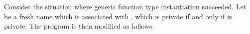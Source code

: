 \documentclass[makeidx]{article}
\begin{document}
{{%
%
%
%
%
%
%
%

\LMHash{}%
Consider the situation where generic function type instantiation succeeded.
Let \gmiName{} be a fresh name which is associated with \id,
which is private if and only if \id{} is private.
The program is then modified as follows:

}}
\end{document}
